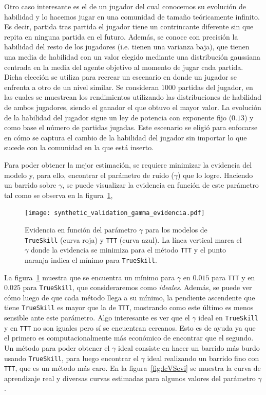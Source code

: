 \documentclass[11pt,twoside,spanish]{report} %
\begin{document}
Otro caso interesante es el de un jugador del cual conocemos su evoluci\'on de habilidad y lo hacemos jugar en una comunidad de tama\~no te\'oricamente infinito.
Es decir, partida tras partida el jugador tiene un contrincante diferente sin que repita en ninguna partida en el futuro. 
Adem\'as, se conoce con precisi\'on la habilidad del resto de los jugadores (i.e. tienen una varianza baja), que tienen una media de habilidad con un valor elegido mediante una distribuci\'on gaussiana centrada en la media del agente objetivo al momento de jugar cada partida.
Dicha elecci\'on se utiliza para recrear un escenario en donde un jugador se enfrenta a otro de un nivel similar.
Se consideran $1000$ partidas del jugador, en las cuales se muestrean los rendimientos utilizando las distribuciones de habilidad de ambos jugadores, siendo el ganador el que obtuvo el mayor valor. 
La evoluci\'on de la habilidad del jugador sigue un ley de potencia con exponente fijo ($0.13$) y como base el n\'umero de partidas jugadas.
Este escenario se eligi\'o para enfocarse en c\'omo se captura el cambio de la habilidad del jugador sin importar lo que sucede con la comunidad en la que est\'a inserto.

Para poder obtener la mejor estimaci\'on, se requiere minimizar la evidencia del modelo y, para ello, encontrar el par\'ametro de ruido ($\gamma$) que lo logre.
Haciendo un barrido sobre $\gamma$, se puede visualizar la evidencia en funci\'on de este par\'ametro tal como se observa en la figura~\ref{fig:gammaVSev},

\begin{figure}[H]
	\centering
	\texttt{[image: synthetic\_validation\_gamma\_evidencia.pdf]}
	\caption{Evidencia en funci\'on del par\'ametro $\gamma$ para los modelos de \texttt{TrueSkill} (curva roja) y \texttt{TTT} (curva azul). 
	La l\'inea vertical marca el $\gamma$ donde la evidencia se minimiza para el m\'etodo \texttt{TTT} y el punto naranja indica el m\'inimo para \texttt{TrueSkill}.}
	\label{fig:gammaVSev}
\end{figure}

La figura~\ref{fig:gammaVSev} muestra que se encuentra un m\'inimo para $\gamma$ en $0.015$ para \texttt{TTT} y en $0.025$ para \texttt{TrueSkill}, que consideraremos como \emph{ideales}.
Adem\'as, se puede ver c\'omo luego de que cada m\'etodo llega a su m\'inimo, la pendiente ascendente que tiene \texttt{TrueSkill} es mayor que la de \texttt{TTT}, mostrando como este \'ultimo es menos sensible ante este par\'ametro.
Algo interesante es ver que el $\gamma$ ideal en \texttt{TrueSkill} y en \texttt{TTT} no son iguales pero s\'i se encuentran cercanos.
Esto es de ayuda ya que el primero es computacionalmente m\'as econ\'omico de encontrar que el segundo.
Un m\'etodo para poder obtener el $\gamma$ ideal consiste en hacer un barrido m\'as burdo usando \texttt{TrueSkill}, para luego encontrar el $\gamma$ ideal realizando un barrido fino con \texttt{TTT}, que es un m\'etodo m\'as caro.
En la figura~\ref{fig:lcVSevi} se muestra la curva de aprendizaje real y diversas curvas estimadas para algunos valores del par\'ametro $\gamma$.
\end{document}
